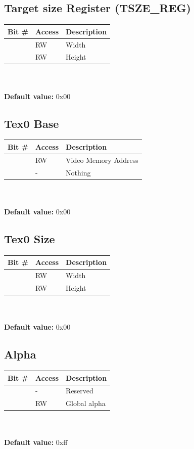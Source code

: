 \documentclass[10pt,a4paper]{article}
\begin{document}
\subsection{Target size Register (TSZE\_REG)}
\begin{tabular}{|l|l|l|}
\hline \textbf{Bit \#} & \textbf{Access} & \textbf{Description} \\ 
\hline
\hline [31:16] & RW & Width \\
\hline [15:0] & RW & Height \\
\hline 
\end{tabular}
\\\\
\textbf{Default value:} 0x00

\subsection{Tex0 Base}
\begin{tabular}{|l|l|l|}
\hline \textbf{Bit \#} & \textbf{Access} & \textbf{Description} \\ 
\hline
\hline [31:2] & RW & Video Memory Address \\
\hline [1:0] & - & Nothing \\
\hline 
\end{tabular}
\\\\
\textbf{Default value:} 0x00

\subsection{Tex0 Size}
\begin{tabular}{|l|l|l|}
\hline \textbf{Bit \#} & \textbf{Access} & \textbf{Description} \\ 
\hline
\hline [31:16] & RW & Width \\
\hline [15:0] & RW & Height \\
\hline 
\end{tabular}
\\\\
\textbf{Default value:} 0x00

\subsection{Alpha}
\begin{tabular}{|l|l|l|}
\hline \textbf{Bit \#} & \textbf{Access} & \textbf{Description} \\ 
\hline
\hline [31:8] & - & Reserved \\
\hline [7:0] & RW & Global alpha \\
\hline 
\end{tabular}
\\\\
\textbf{Default value:} 0xff
\end{document}
